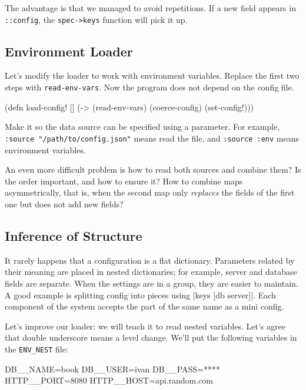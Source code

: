 The advantage is that we managed to avoid repetitions. If a new field appears in \verb|::config|, the \verb|spec->keys| function will pick it up.

\subsection{Environment Loader}

Let's modify the loader to work with environment variables. Replace the first two steps with \verb|read-env-vars|. Now the program does not depend on the config file.

\begin{clojure}
(defn load-config! []
  (-> (read-env-vars)
      (coerce-config)
      (set-config!)))
\end{clojure}

Make it so the data source can be specified using a parameter. For example, \verb|:source "/path/to/config.json"| means read the file, and \verb|:source :env| means environment variables.


An even more difficult problem is how to read both sources and combine them? Is
the order important, and how to ensure it? How to combine maps asymmetrically,
that is, when the second map only \emph{replaces} the fields of the first one
but does not add new fields?

\subsection{Inference of Structure}


It rarely happens that a configuration is a flat dictionary. Parameters related by their meaning are placed in nested dictionaries; for example, server and database fields are separate. When the settings are in a group, they are easier to maintain. A good example is splitting config into pieces using \spverb|{keys [db server]}|. Each component of the system accepts the part of the same name as a mini config.

Let's improve our loader: we will teach it to read nested variables. Let's agree that double underscore means a level change. We'll put the following variables
in the \verb|ENV_NEST| file:

\begin{bash}
DB__NAME=book
DB__USER=ivan
DB__PASS=****
HTTP__PORT=8080
HTTP__HOST=api.random.com
\end{bash}

